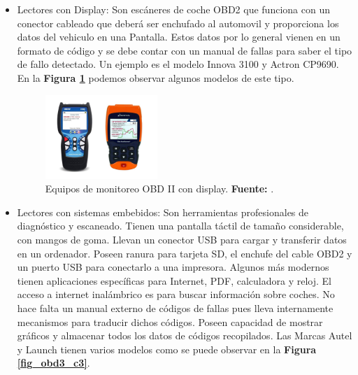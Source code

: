 \begin{itemize}
	
	
	
	\item Lectores con Display: Son escáneres de coche OBD2 que funciona con un conector cableado que deberá ser enchufado al automovil y proporciona los datos del vehiculo en una Pantalla. Estos datos por lo general vienen en un formato de código y se debe contar con un manual de fallas para saber el tipo de fallo detectado. Un ejemplo es el modelo Innova 3100 y  Actron CP9690. En la \textbf{Figura \ref{fig_obd2_c3}} podemos observar algunos modelos de este tipo. 
	
	
	
	\begin{figure}[H]
		\centering
		\includegraphics[width=0.4\textwidth]{./Cap3imagen/Innova.JPG}
		\caption[Equipos de monitoreo OBD II con display.]{Equipos de monitoreo OBD II con display.\textbf{ Fuente:} \cite{cite_obd0_c3}.}
		\label{fig_obd2_c3} %
	\end{figure}
	
	
	\item Lectores con sistemas embebidos: Son  herramientas profesionales de diagnóstico y escaneado. Tienen una pantalla táctil de tamaño considerable, con mangos de goma. Llevan un conector USB para cargar y transferir datos en un ordenador. Poseen ranura para tarjeta SD, el enchufe del cable OBD2 y un puerto USB para conectarlo a una impresora. Algunos más modernos  tienen aplicaciones específicas para Internet, PDF, calculadora y reloj. El acceso a internet inalámbrico es para buscar información sobre coches. No hace falta un manual externo de códigos de fallas pues lleva internamente mecanismos para traducir dichos códigos.  Poseen capacidad de mostrar gráficos  y almacenar todos los datos de códigos recopilados. Las Marcas Autel y Launch tienen varios modelos como se puede observar en la \textbf{Figura \ref{fig_obd3_c3}}. 
	

\end{itemize}
